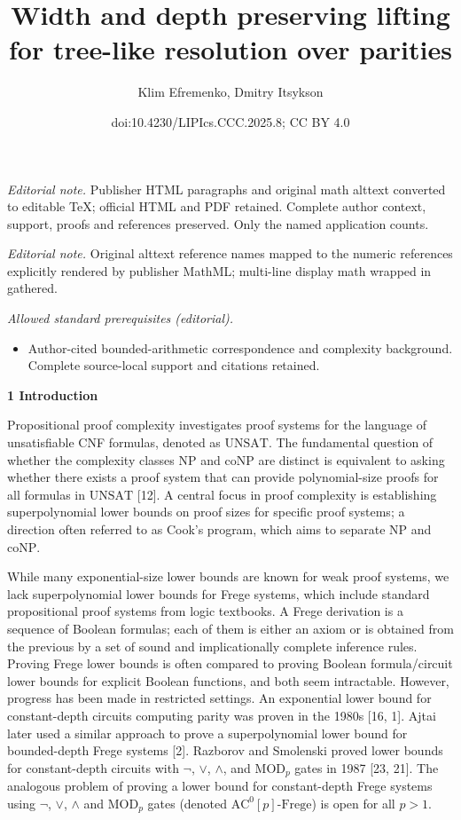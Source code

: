 \documentclass[10pt,a4paper]{article}
\title{Width and depth preserving lifting for tree-like resolution over parities}
\author{Klim Efremenko, Dmitry Itsykson}
\date{doi:10.4230/LIPIcs.CCC.2025.8; CC BY 4.0}
\begin{document}
\maketitle
\noindent\textit{Editorial note.} Publisher HTML paragraphs and original math alttext converted to editable TeX; official HTML and PDF retained. Complete author context, support, proofs and references preserved. Only the named application counts.\par\medskip
\noindent\textit{Editorial note.} Original alttext reference names mapped to the numeric references explicitly rendered by publisher MathML; multi-line display math wrapped in gathered.\par\medskip
\noindent\textit{Allowed standard prerequisites (editorial).}\begin{itemize}
\item Author-cited bounded-arithmetic correspondence and complexity background. Complete source-local support and citations retained.
\end{itemize}\medskip

\par\medskip\noindent\textbf{
1 Introduction}\par


Propositional proof complexity investigates proof systems for the language of unsatisfiable CNF formulas, denoted as $\mathrm{UNSAT}$. The fundamental question of whether the complexity classes $\mathrm{NP}$ and $\mathrm{coNP}$ are distinct is equivalent to asking whether there exists a proof system that can provide polynomial-size proofs for all formulas in $\mathrm{UNSAT}$ [12]. A central focus in proof complexity is establishing superpolynomial lower bounds on proof sizes for specific proof systems; a direction often referred to as Cook’s program, which aims to separate $\mathrm{NP}$ and $\mathrm{coNP}$.\par



While many exponential-size lower bounds are known for weak proof systems, we lack superpolynomial lower bounds for Frege systems, which include standard propositional proof systems from logic textbooks. A Frege derivation is a sequence of Boolean formulas; each of them is either an axiom or is obtained from the previous by a set of sound and implicationally complete inference rules. Proving Frege lower bounds is often compared to proving Boolean formula/circuit lower bounds for explicit Boolean functions, and both seem intractable. However, progress has been made in restricted settings. An exponential lower bound for constant-depth circuits computing parity was proven in the 1980s [16, 1]. Ajtai later used a similar approach to prove a superpolynomial lower bound for bounded-depth Frege systems [2]. Razborov and Smolenski proved lower bounds for constant-depth circuits with $\lnot$, $\lor$, $\land$, and $\mathrm{MOD}_{p}$ gates in 1987 [23, 21].
The analogous problem of proving a lower bound for constant-depth Frege systems using $\lnot$, $\lor$, $\land$ and $\mathrm{MOD}_{p}$ gates (denoted $\mathrm{AC}^{0}[p]\text{-}\mathrm{Frege}$) is open for all $p>1$.\par
\end{document}

